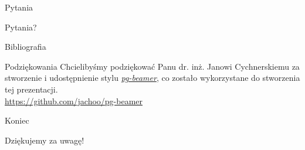 \begin{frame}{Pytania}
    \begin{center}
        {\huge Pytania?}
    \end{center}
\end{frame}

\nocite{*}
\begin{frame}[allowframebreaks]{Bibliografia}
    \printbibliography
\end{frame}

\begin{frame}{Podziękowania}
    Chcielibyśmy podziękować Panu dr. inż. Janowi Cychnerskiemu za stworzenie 
    i udostępnienie stylu \href{https://github.com/jachoo/pg-beamer}{\emph{pg-beamer}}, 
    co zostało wykorzystane do stworzenia tej prezentacji.\\
    \url{https://github.com/jachoo/pg-beamer}
     
\end{frame}

\begin{frame}{Koniec}
    \begin{center}
        {\huge Dziękujemy za uwagę!}
    \end{center}
\end{frame}

\pglastframe